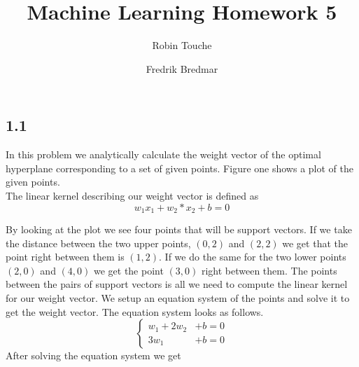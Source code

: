 \documentclass{article}
\author{
  Robin Touche \\
  \and
  Fredrik Bredmar
}
\title{Machine Learning Homework 5}
\begin{document}
\maketitle

\subsection*{1.1}
In this problem we analytically calculate the weight vector of the optimal hyperplane corresponding to a set of given points.
Figure one shows a plot of the given points.\\

The linear kernel describing our weight vector is defined as
\[
w_1x_1 + w_2*x_2 + b = 0
\]

By looking at the plot we see four points that will be support vectors.
If we take the distance between the two upper points, $(0,2)$ and $(2,2)$ we get that the point right between them is $(1,2)$.
If we do the same for the two lower points $(2,0)$ and $(4,0)$ we get the point $(3,0)$ right between them.
The points between the pairs of support vectors is all we need to compute the linear kernel for our weight vector. We setup an equation system of the points and solve it to get the weight vector.
The equation system looks as follows.
\[
\begin{cases}

  w_1  + 2w_2 &+ b = 0 \\
  3w_1 &+  b = 0

\end{cases}
\]
After solving the equation system we get
\end{document}
